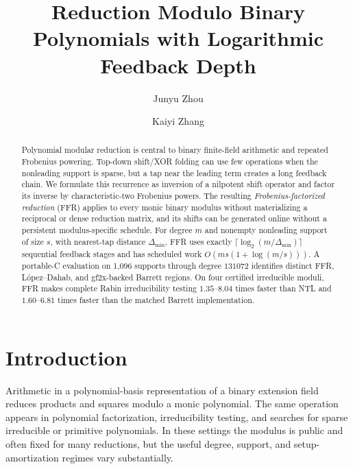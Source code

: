 \documentclass{mcom-l}
\title[Reduction Modulo Binary Polynomials]{Reduction Modulo Binary
Polynomials with Logarithmic Feedback Depth}
\author{Junyu Zhou}
\author{Kaiyi Zhang}
\numberwithin{equation}{section}
\theoremstyle{definition}
\theoremstyle{remark}
\newcommand{\Dmin}{\Delta_{\min}}
\begin{document}
\begin{abstract}
Polynomial modular reduction is central to binary finite-field arithmetic and
repeated Frobenius powering.  Top-down shift/XOR folding can use few operations
when the nonleading support is sparse, but a tap near the leading term creates
a long feedback chain.  We
formulate this recurrence as inversion of a nilpotent shift operator and factor
its inverse by characteristic-two Frobenius powers.  The resulting
\emph{Frobenius-factorized reduction} (FFR) applies to every monic binary
modulus without materializing a reciprocal or dense reduction matrix, and its
shifts can be generated online without a persistent modulus-specific schedule.
For degree $m$ and nonempty nonleading support of size $s$, with nearest-tap
distance $\Dmin$, FFR uses exactly $\lceil\log_2(m/\Dmin)\rceil$ sequential
feedback stages and has scheduled work $O(ms(1+\log(m/s)))$.  A portable-C
evaluation on 1,096 supports through degree
$131072$ identifies distinct FFR, L\'opez--Dahab, and gf2x-backed Barrett
regions.  On four certified irreducible moduli, FFR makes complete Rabin
irreducibility testing $1.35$--$8.04$ times faster than NTL and
$1.60$--$6.81$ times faster than the matched Barrett implementation.
\end{abstract}

\maketitle

\section{Introduction}
\label{sec:introduction}

Arithmetic in a polynomial-basis representation of a binary extension field
reduces products and squares modulo a monic polynomial.  The same operation
appears in polynomial factorization, irreducibility testing, and searches for
sparse irreducible or primitive polynomials.  In these settings the modulus is
public and often fixed for many reductions, but the useful degree, support,
and setup-amortization regimes vary substantially.
\end{document}
